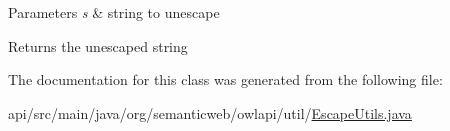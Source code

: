 \begin{DoxyParams}{Parameters}
{\em s} & string to unescape \\
\hline
\end{DoxyParams}
\begin{DoxyReturn}{Returns}
the unescaped string 
\end{DoxyReturn}


The documentation for this class was generated from the following file\-:\begin{DoxyCompactItemize}
\item 
api/src/main/java/org/semanticweb/owlapi/util/\hyperlink{api_2src_2main_2java_2org_2semanticweb_2owlapi_2util_2_escape_utils_8java}{Escape\-Utils.\-java}\end{DoxyCompactItemize}
